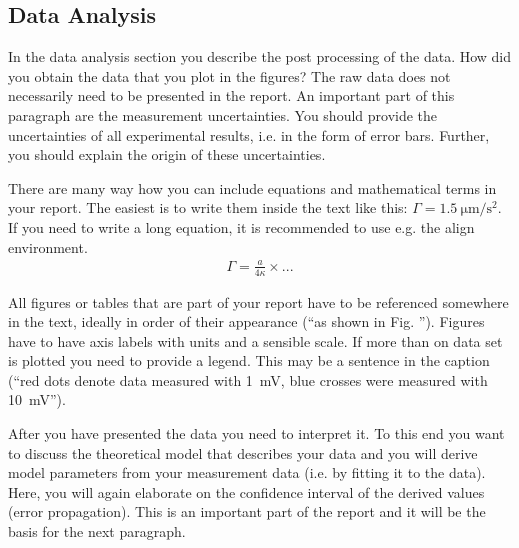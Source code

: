 \subsection{Data Analysis}

In the data analysis section you describe the post processing of the
data. How did you obtain the data that you plot in the figures? The raw data does not necessarily need
to be presented in the report. An important part of this paragraph
are the measurement uncertainties. You should provide the
uncertainties of all experimental results, i.e. in the form of error
bars. Further, you should explain the origin of these uncertainties.

There are many way how you can include equations and mathematical terms in your report. The easiest is to write them inside the text like this: $\Gamma =\SI{1.5}{\micro\meter\per\square\second}$. If you need to write a long equation, it is recommended to use e.g. the align environment.
\begin{align}
    \Gamma = \frac{a}{4\kappa}\times ...
\end{align}

All figures or tables that are part of your report have to be
referenced somewhere in the text, ideally in order of their
appearance (``as shown in Fig. ''). Figures have to
have axis labels with units and a sensible scale. If more than on
data set is plotted you need to provide a legend. This may be a sentence in the caption (``red dots denote data measured with \SI{1}{\milli\volt}, blue crosses were measured with \SI{10}{\milli\volt}'').

After you have presented the data you need to interpret it. To this
end you want to discuss the theoretical model that describes your
data and you will derive model parameters from your measurement data
(i.e. by fitting it to the data). Here, you will again elaborate on
the confidence interval of the derived values (error propagation).
This is an important part of the report and it will be the basis for
the next paragraph.